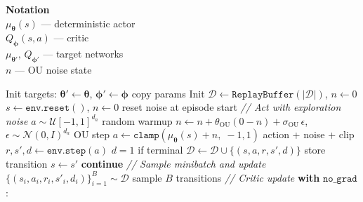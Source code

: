\documentclass[11pt]{article}
\begin{document}
\begin{algorithm}[p]
\begin{minipage}[t]{0.28\linewidth}
\vspace{6pt}
\textbf{Notation} \\[2pt]
$\mu_{\boldsymbol{\theta}}(s)$ --- deterministic actor \\
$Q_{\boldsymbol{\phi}}(s,a)$ --- critic \\
$\mu_{\boldsymbol{\theta}'},\, Q_{\boldsymbol{\phi}'}$ --- target networks \\
$n$ --- OU noise state
\end{minipage}%
\hfill
\vrule
\hfill
\begin{minipage}[t]{0.68\linewidth}
\begin{algorithmic}[1]
\State Init targets: $\boldsymbol{\theta}' \gets \boldsymbol{\theta}$, \; $\boldsymbol{\phi}' \gets \boldsymbol{\phi}$ \hfill copy params
\State Init $\mathcal{D} \gets \texttt{ReplayBuffer}(|\mathcal{D}|)$, \; $n \gets 0$
    \State $s \gets \texttt{env.reset}()$, \; $n \gets 0$ \hfill reset noise at episode start
        \Statex \hspace{\algorithmicindent}\hspace{\algorithmicindent}\hspace{\algorithmicindent}\textit{// Act with exploration noise}
            \State $a \sim \mathcal{U}[-1, 1]^{d_a}$ \hfill random warmup
        \Else
            \State $n \gets n + \theta_{\text{OU}}(0 - n) + \sigma_{\text{OU}}\,\epsilon$, \;\; $\epsilon \sim \mathcal{N}(0, I)^{d_a}$ \hfill OU step
            \State $a \gets \texttt{clamp}(\mu_{\boldsymbol{\theta}}(s) + n,\; {-}1, 1)$ \hfill action + noise + clip
        \EndIf
        \State $r, s', d \gets \texttt{env.step}(a)$ \hfill $d = 1$ if terminal
        \State $\mathcal{D} \gets \mathcal{D} \cup \{(s, a, r, s', d)\}$ \hfill store transition
        \State $s \gets s'$
         \textbf{continue} \EndIf
        \Statex \hspace{\algorithmicindent}\hspace{\algorithmicindent}\hspace{\algorithmicindent}\textit{// Sample minibatch and update}
        \State $\{(s_i, a_i, r_i, s'_i, d_i)\}_{i=1}^B \sim \mathcal{D}$ \hfill sample $B$ transitions
        \Statex \hspace{\algorithmicindent}\hspace{\algorithmicindent}\hspace{\algorithmicindent}\textit{// Critic update}
        \State \textbf{with} $\texttt{no\_grad}$:

\end{algorithmic}
\end{minipage}
\end{algorithm}
\end{document}
